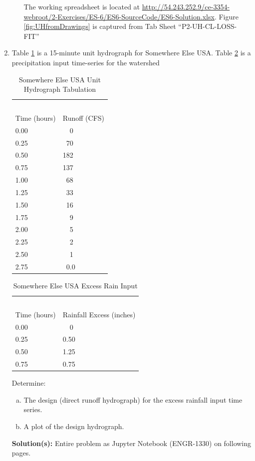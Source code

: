 \documentclass[12pt]{article}
\begin{document}
\begin{enumerate}
\begin{enumerate}[a)]
The working spreadsheet is located at \url{http://54.243.252.9/ce-3354-webroot/2-Exercises/ES-6/ES6-SourceCode/ES6-Solution.xlsx}. Figure \ref{fig:UHfromDrawings} is captured from Tab Sheet ``P2-UH-CL-LOSS-FIT''

\end{enumerate}

\clearpage

\item Table \ref{tab:SomewhereElseUSAUnitgraph} is a 15-minute unit hydrograph for Somewhere Else USA.  Table \ref{tab:SomewhereElseUSAExcessRain} is a precipitation input time-series for the watershed

\begin{table}[h!]
\centering
\caption{Somewhere Else USA Unit Hydrograph Tabulation}
\begin{tabular}{p{2.0in}p{2.0in}} %
~&~\\
Time (hours) & Runoff (CFS) \\
\hline
\hline
0.00 & ~~0 \\
0.25 & ~70 \\
0.50 & 182 \\
0.75 & 137 \\
1.00 & ~68 \\
1.25 & ~33 \\
1.50 & ~16 \\
1.75 & ~~9 \\
2.00 & ~~5 \\
2.25 & ~~2 \\
2.50 & ~~1 \\
2.75 & ~0.0 \\
\hline
\end{tabular}
\label{tab:SomewhereElseUSAUnitgraph}
\end{table}

\begin{table}[h!]
\centering
\caption{Somewhere Else USA Excess Rain Input}
\begin{tabular}{p{2.0in}p{2.0in}} %
~&~\\
Time (hours) & Rainfall Excess (inches) \\
\hline
\hline
0.00 & ~~0 \\
0.25 & 0.50 \\
0.50 & 1.25 \\
0.75 & 0.75 \\
\hline
\end{tabular}
\label{tab:SomewhereElseUSAExcessRain}
\end{table}

Determine:
    \begin{enumerate}[a)]
        \item The design (direct runoff hydrograph) for the excess rainfall input time series.
        \item A plot of the design hydrograph.
    \end{enumerate}

\textbf{Solution(s):}
Entire problem as Jupyter Notebook (ENGR-1330) on following pages.


\end{enumerate}
\end{document}
